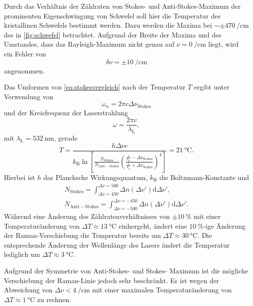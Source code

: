 \documentclass[../bericht.tex]{subfiles}
\begin{document}
    Durch das Verhältnis der Zählraten von Stokes- und Anti-Stokes-Maximum der prominenten Eigenschwingung von Schwefel soll hier die Temperatur des kristallinen Schwefels bestimmt werden. Dazu werden die Maxima bei $\sim\pm\SI{470}{\per\centi\meter}$ des in \cref{fig:schwefel} betrachtet. Aufgrund der Breite der Maxima und des Umstandes, dass das Rayleigh-Maximum nicht genau auf $\nu=\SI{0}{\per\centi\meter}$ liegt, wird ein Fehler von
    \begin{equation*}
      \delta \nu = \pm\SI{10}{\per\centi\meter}
    \end{equation*}
    angenommen.

    Das Umformen von \cref{eq:stokesvergleich} nach der Temperatur $T$ ergibt unter Verwendung von
    \begin{equation*}
      \omega_n = 2\pi c \Delta \nu_\mathrm{Stokes}
    \end{equation*}
    und der Kreisfrequenz der Laserstrahlung
    \begin{equation*}
      \omega = \frac{2\pi c}{\lambda_\mathrm{L}},
    \end{equation*}
    mit $\lambda_\mathrm{L}=\SI{532}{\nano\meter}$, gerade
    \begin{equation*}
      T = \frac{h \Delta \nu  c}{k_\mathrm{B}\ln\left[ \frac{N_\mathrm{Stokes}}{N_\mathrm{Anti-Stokes}} \left( \frac{\frac{1}{\lambda_\mathrm{L}} - \Delta \nu_\mathrm{Stokes}}{\frac{1}{\lambda_\mathrm{L}}+\Delta \nu_\mathrm{Stokes}} \right)^4 \right]}=\SI{21}{\celsius}.
    \end{equation*}
    Hierbei ist $h$ das Plancksche Wirkungsquantum, $k_\mathrm{B}$ die Boltzmann-Konstante und
    \begin{align*}
      N_\mathrm{Stokes}=\int_{\Delta \nu = 450}^{\Delta \nu = 500}\Delta n(\Delta \nu') \mathrm{d}\Delta\nu', \\
      N_\mathrm{Anti-Stokes}=\int_{\Delta \nu = -500}^{\Delta \nu = -450}\Delta n(\Delta \nu') \mathrm{d}\Delta\nu'.
    \end{align*}
    Während eine Änderung des Zählratenverhältnisses von $\pm\SI{10}{\percent}$ mit einer Temperaturänderung von $\Delta T \approx \SI{13}{\celsius} $ einhergeht, ändert eine $\SI{10}{\percent}$-ige Änderung der Raman-Verschiebung die Temperatur bereits um $\Delta T\approx\SI{30}{\celsius}$. Die entsprechende Änderung der Wellenlänge des Lasers ändert die Temperatur lediglich um $\Delta T\approx \SI{3}{\celsius}$.

    Aufgrund der Symmetrie von Anti-Stokes- und Stokes- Maximum ist die mögliche Verschiebung der Raman-Linie jedoch sehr beschränkt. Es ist wegen der Abweichung von $\Delta \nu <\SI{4}{\per\centi\meter}$ mit einer maximalen Temperaturänderung von $\Delta T\approx\SI{1}{\celsius}$ zu rechnen.
\end{document}
